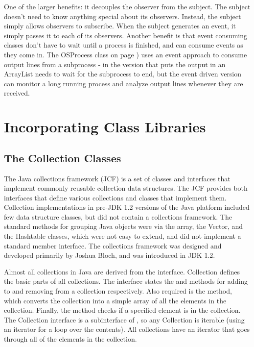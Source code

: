 One of the larger benefits: it decouples the observer from the
subject. The subject doesn't need to know anything special about its
observers. Instead, the subject simply allows observers to
subscribe. When the subject generates an event, it simply passes it to
each of its observers. Another benefit is that event consuming classes
don't have to wait until a process is finished, and can consume events
as they come in. The OSProcess class on page
\pageref{outputeventlistener}) uses an event approach to consume
output lines from a subprocess - in the version that puts the output
in an ArrayList needs to wait for the subprocess to end, but the event
driven version can monitor a long running process and analyze output
lines whenever they are received.

\chapter{Incorporating Class Libraries}
\section{The Collection Classes}
The Java collections framework (JCF) is a set of classes and interfaces that implement commonly reusable collection data structures.
The JCF provides both interfaces that define various
collections and classes that implement them. Collection
implementations in pre-JDK 1.2 versions of the Java platform included
few data structure classes, but did not contain a collections
framework. The standard methods for grouping Java objects were via the array, the Vector, and the Hashtable classes, which were not easy to extend, and did not implement a standard member interface.
The collections framework was designed and developed primarily by
Joshua Bloch, and was introduced in JDK 1.2.

Almost all collections in Java are derived from the
 interface. Collection defines the basic parts of
all collections. The interface states the  and  methods
for adding to and removing from a collection respectively. Also
required is the  method, which converts the collection into a
simple array of all the elements in the collection. Finally, the
 method checks if a specified element is in the
collection. The Collection interface is a subinterface of
, so any Collection is iterable (using an
iterator for a loop over the contents).
All collections have an iterator that goes
through all of the elements in the collection.

